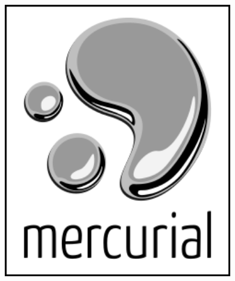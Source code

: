 \documentclass[12pt,letterpaper]{article}
\begin{document}
\vspace*{-0.025in}
\begin{figure}[htb]
\begin{center}
\includegraphics[width=10cm]{./Imagenes/Mercurial}
\end{center}
\end{figure}

\part{ }
\end{document}
